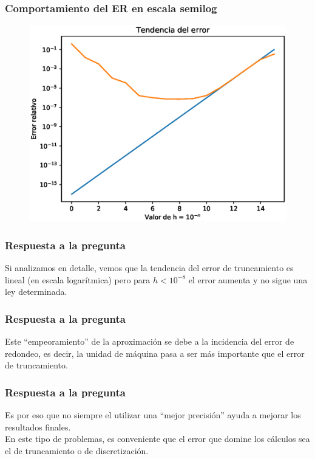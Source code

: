 \documentclass[12pt]{beamer}
\begin{document}
\begin{frame}
\frametitle{Comportamiento del ER en escala semilog}
\begin{figure}
	\centering
    \includegraphics[scale=0.55]{Imagenes/Ejercicio_Derivada_01.eps}
\end{figure}
\end{frame}
\begin{frame}
\frametitle{Respuesta a la pregunta}
Si analizamos en detalle, vemos que la tendencia del error de truncamiento es lineal (en escala logarítmica) pero para $h < 10^{-8}$ el error aumenta y no sigue una ley determinada. 
\end{frame}
\begin{frame}
\frametitle{Respuesta a la pregunta}
Este \enquote{empeoramiento} de la aproximación se debe a la incidencia del error de redondeo, es decir, la unidad de máquina pasa a ser más importante que el error de truncamiento.
\end{frame}
\begin{frame}
\frametitle{Respuesta a la pregunta}
Es por eso que no siempre el utilizar una \enquote{mejor precisión} ayuda a mejorar los resultados finales. 
\\
\bigskip
En este tipo de problemas, es conveniente que el error que domine los cálculos sea el de truncamiento o de discretización.
\end{frame}



\end{document}
